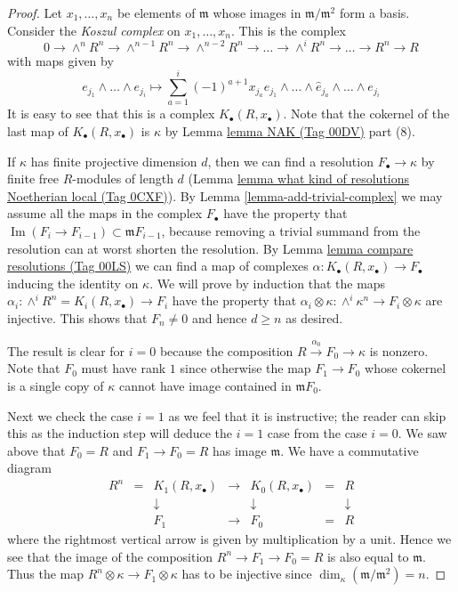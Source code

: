 \documentclass{amsart}
\theoremstyle{plain}
\theoremstyle{definition}
\theoremstyle{remark}
\numberwithin{equation}{subsection}
\def\Im{\mathop{\mathrm{Im}}}
\begin{document}
\begin{proof}
Let $x_1 , \ldots, x_n$ be elements of $\mathfrak m$
whose images in $\mathfrak m / \mathfrak m^2$ form a basis.
Consider the {\it Koszul complex} on $x_1, \ldots, x_n$.
This is the complex
$$
0 \to \wedge^n R^n \to \wedge^{n-1} R^n \to \wedge^{n-2} R^n \to
\ldots \to \wedge^i R^n \to \ldots \to R^n \to R
$$
with maps given by
$$
e_{j_1} \wedge \ldots \wedge e_{j_i}
\longmapsto
\sum_{a = 1}^i (-1)^{a + 1} x_{j_a} e_{j_1} \wedge \ldots
\wedge \hat e_{j_a} \wedge \ldots \wedge e_{j_i}
$$
It is easy to see that this is a complex $K_{\bullet}(R, x_{\bullet})$.
Note that the cokernel of the last map of $K_{\bullet}(R, x_{\bullet})$
is $\kappa$ by Lemma \href{https://stacks.math.columbia.edu/tag/00DV}{lemma NAK (Tag 00DV)} part (8).

\medskip\noindent
If $\kappa$ has finite projective dimension $d$, then we can find
a resolution $F_{\bullet} \to \kappa$ by finite free $R$-modules
of length $d$
(Lemma \href{https://stacks.math.columbia.edu/tag/0CXF}{lemma what kind of resolutions Noetherian local (Tag 0CXF)}).
By Lemma \ref{lemma-add-trivial-complex}
we may assume all the maps in the complex $F_{\bullet}$
have the property that $\Im(F_i \to F_{i-1})
\subset \mathfrak m F_{i-1}$, because removing a trivial
summand from the resolution can at worst shorten the resolution.
By Lemma \href{https://stacks.math.columbia.edu/tag/00LS}{lemma compare resolutions (Tag 00LS)} we can find a map
of complexes $\alpha : K_{\bullet}(R, x_{\bullet}) \to F_{\bullet}$
inducing the identity on $\kappa$. We will prove by induction
that the maps $\alpha_i : \wedge^i R^n = K_i(R, x_{\bullet}) \to F_i$
have the property that
$\alpha_i \otimes \kappa : \wedge^i \kappa^n \to F_i \otimes \kappa$
are injective. This shows that $F_n \not = 0$ and hence $d \geq n$
as desired.

\medskip\noindent
The result is clear for $i = 0$ because the composition
$R \xrightarrow{\alpha_0} F_0 \to \kappa$ is nonzero.
Note that $F_0$ must have rank $1$ since
otherwise the map $F_1 \to F_0$ whose cokernel is a single
copy of $\kappa$ cannot have image contained in $\mathfrak m F_0$.

\medskip\noindent
Next we check the case $i = 1$ as we feel that it is instructive;
the reader can skip this as the induction step will deduce the $i = 1$
case from the case $i = 0$. We saw above that
$F_0 = R$ and $F_1 \to F_0 = R$ has image $\mathfrak m$.
We have a commutative diagram
$$
\begin{matrix}
R^n & = & K_1(R, x_{\bullet}) & \to & K_0(R, x_{\bullet}) & = & R \\
& & \downarrow & & \downarrow & & \downarrow \\
& & F_1 & \to & F_0 & = & R
\end{matrix}
$$
where the rightmost vertical arrow is given by multiplication
by a unit. Hence we see that the image of the composition
$R^n \to F_1 \to F_0 = R$ is also equal to $\mathfrak m$.
Thus the map $R^n \otimes \kappa \to F_1 \otimes \kappa$
has to be injective since $\dim_\kappa (\mathfrak m / \mathfrak m^2) = n$.


\end{proof}
\end{document}
